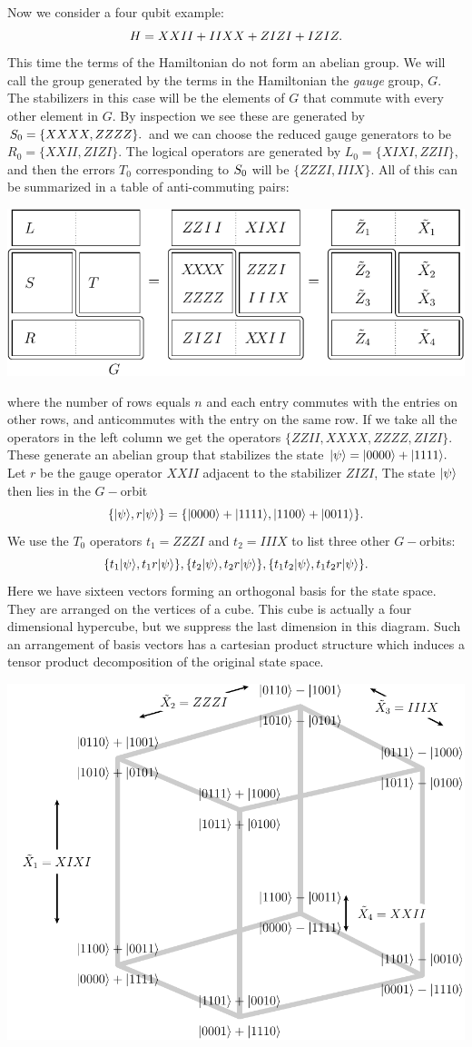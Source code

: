 Now we consider a four qubit example:
$$
    H = XXII + IIXX + ZIZI + IZIZ.
$$
This time the terms of the Hamiltonian do not form
an abelian group.
We will call the group generated by the terms in the Hamiltonian
the \emph{gauge} group, $G$.
The stabilizers in this case will be the elements of $G$
that commute with every other element in $G.$
By inspection we see these are generated by $S_0=\{XXXX, ZZZZ\}.$
and we can choose the reduced gauge generators to be $R_0=\{XXII, ZIZI\}.$
The logical operators are generated by $L_0 = \{XIXI, ZZII\},$
and then the errors $T_0$ corresponding to $S_0$ will
be $\{ZZZI, IIIX\}.$
All of this can be summarized in a table of anti-commuting pairs:
\begin{center}
\includegraphics[]{pic-gauge4.pdf}
\end{center}
where the number of rows equals $n$ and each entry
commutes with the entries on other rows, and anticommutes
with the entry on the same row. 
If we take all the operators in the left column
we get the operators 
$\{ ZZII, XXXX, ZZZZ, ZIZI \}.$ 
These generate an abelian group 
that stabilizes the
state $|{\psi}\rangle = |{0000}\rangle+|{1111}\rangle.$
Let $r$ be the gauge operator $XXII$ adjacent to the 
stabilizer $ZIZI$,
The state $|{\psi}\rangle$ then lies in the $G-$orbit 
$$
\{|{\psi}\rangle, r|{\psi}\rangle\} = \{|{0000}\rangle+|{1111}\rangle, |{1100}\rangle+|{0011}\rangle\}.
$$
We use the $T_0$ operators $t_1=ZZZI$ and $t_2=IIIX$
to list three other $G-$orbits:
$$
\{t_1 |{\psi}\rangle, t_1 r|{\psi}\rangle\}, 
\{t_2 |{\psi}\rangle, t_2 r|{\psi}\rangle\}, 
\{t_1 t_2 |{\psi}\rangle, t_1 t_2 r|{\psi}\rangle\}.
$$
Here we have sixteen vectors forming an orthogonal basis for the state space.
They are arranged on the vertices of a cube. This cube is actually a four
dimensional hypercube, but we suppress the last dimension in
this diagram.
Such an arrangement of basis vectors has a cartesian product
structure which induces a tensor product decomposition of
the original state space.
\begin{center}
\includegraphics[width=0.7\columnwidth]{pic-operators.pdf}
\end{center}
